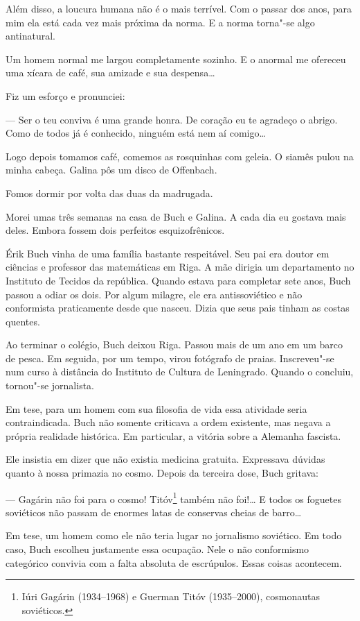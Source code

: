 Além disso, a loucura humana não é o mais terrível. Com o passar dos
anos, para mim ela está cada vez mais próxima da norma. E a norma
torna"-se algo antinatural.

Um homem normal me largou completamente sozinho. E o anormal me ofereceu
uma xícara de café, sua amizade e sua despensa\ldots{}

Fiz um esforço e pronunciei:

--- Ser o teu conviva é uma grande honra. De coração eu te agradeço o
abrigo. Como de todos já é conhecido, ninguém está nem aí comigo\ldots{}

Logo depois tomamos café, comemos as rosquinhas com geleia. O siamês
pulou na minha cabeça. Galina pôs um disco de Offenbach.

Fomos dormir por volta das duas da madrugada.

Morei umas três semanas na casa de Buch e Galina. A cada dia eu gostava
mais deles. Embora fossem dois perfeitos esquizofrênicos.

Érik Buch vinha de uma família bastante respeitável. Seu pai era doutor
em ciências e professor das matemáticas em Riga. A mãe dirigia um
departamento no Instituto de Tecidos da república. Quando estava para
completar sete anos, Buch passou a odiar os dois. Por algum milagre, ele
era antissoviético e não conformista praticamente desde que nasceu.
Dizia que seus pais tinham as costas quentes.

Ao terminar o colégio, Buch deixou Riga. Passou mais de um ano em um
barco de pesca. Em seguida, por um tempo, virou fotógrafo de praias.
Inscreveu"-se num curso à distância do Instituto de Cultura de
Leningrado. Quando o concluiu, tornou"-se jornalista.

Em tese, para um homem com sua filosofia de vida essa atividade seria
contraindicada. Buch não somente criticava a ordem existente, mas negava
a própria realidade histórica. Em particular, a vitória sobre a Alemanha
fascista.

Ele insistia em dizer que não existia medicina gratuita. Expressava
dúvidas quanto à nossa primazia no cosmo. Depois da terceira dose, Buch
gritava:

--- Gagárin não foi para o cosmo! Titóv\footnote{Iúri Gagárin
  (1934--1968) e Guerman Titóv (1935--2000), cosmonautas soviéticos.}
também não foi!\ldots{} E todos os foguetes soviéticos não passam de enormes
latas de conservas cheias de barro\ldots{}

Em tese, um homem como ele não teria lugar no jornalismo soviético. Em
todo caso, Buch escolheu justamente essa ocupação. Nele o não
conformismo categórico convivia com a falta absoluta de escrúpulos.
Essas coisas acontecem.

